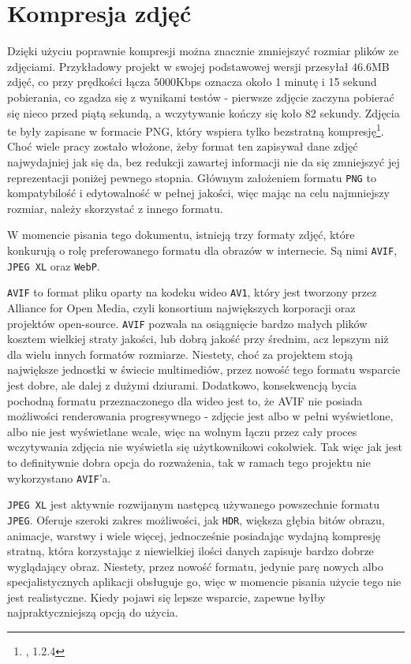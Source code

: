 \documentclass[licencjacka]{pracadypl}
\begin{document}
\section{Kompresja zdjęć}

Dzięki użyciu poprawnie kompresji można znacznie zmniejszyć rozmiar plików ze zdjęciami. Przykładowy projekt w swojej podstawowej wersji przesyłał $46.6$MB zdjęć, co przy prędkości łącza $5000$Kbps oznacza około 1 minutę i 15 sekund pobierania, co zgadza się z wynikami testów - pierwsze zdjęcie zaczyna pobierać się nieco przed piątą sekundą, a wczytywanie kończy się koło 82 sekundy. Zdjęcia te były zapisane w formacie PNG, który wspiera tylko bezstratną kompresję\footnote{\cite{png}, 1.2.4}. Choć wiele pracy zostało włożone, żeby format ten zapisywał dane zdjęć najwydajniej jak się da, bez redukcji zawartej informacji nie da się zmniejszyć jej reprezentacji poniżej pewnego stopnia. Głównym założeniem formatu \texttt{PNG} to kompatybilość \linebreak i edytowalność w pełnej jakości, więc mając na celu najmniejszy rozmiar, należy skorzystać z innego formatu.

W momencie pisania tego dokumentu, istnieją trzy formaty zdjęć, które konkurują o rolę preferowanego formatu dla obrazów w internecie. Są nimi \texttt{AVIF}, \texttt{JPEG XL} oraz \texttt{WebP}. 

\texttt{AVIF} to format pliku oparty na kodeku wideo \texttt{AV1}, który jest tworzony przez Alliance for Open Media, czyli konsortium największych korporacji oraz projektów open-source. \texttt{AVIF} pozwala na osiągnięcie bardzo małych plików kosztem wielkiej straty jakości, lub dobrą jakość przy średnim, acz lepszym niż dla wielu innych formatów rozmiarze. Niestety, choć za projektem stoją największe jednostki w świecie multimediów, przez nowość tego formatu wsparcie jest dobre, ale dalej z dużymi dziurami. Dodatkowo, konsekwencją bycia pochodną formatu przeznaczonego dla wideo jest to, że AVIF nie posiada możliwości renderowania progresywnego - zdjęcie jest albo w pełni wyświetlone, albo nie jest wyświetlane wcale, więc na wolnym łączu przez cały proces wczytywania zdjęcia nie wyświetla się użytkownikowi cokolwiek. Tak więc jak jest to definitywnie dobra opcja do rozważenia, tak w ramach tego projektu nie wykorzystano \texttt{AVIF}'a.

\texttt{JPEG XL} jest aktywnie rozwijanym następcą używanego powszechnie formatu \texttt{JPEG}. Oferuje szeroki zakres możliwości, jak \texttt{HDR}, większa głębia bitów obrazu, animacje, warstwy \linebreak i wiele więcej, jednocześnie posiadając wydajną kompresję stratną, która korzystając z niewielkiej ilości danych zapisuje bardzo dobrze wyglądający obraz. Niestety, przez nowość formatu, jedynie parę nowych albo specjalistycznych aplikacji obsługuje go, więc w momencie pisania użycie tego nie jest realistyczne. Kiedy pojawi się lepsze wsparcie, zapewne byłby najpraktyczniejszą opcją do użycia.
\end{document}
